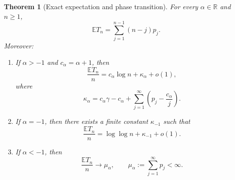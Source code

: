 \documentclass[11pt,a4paper]{article}
\newtheorem{theorem}{Theorem}[section]
\newcommand{\E}{\mathbb{E}}
\newcommand{\1}{\mathbf{1}}
\newcommand{\R}{\mathbb{R}}
\begin{document}
\begin{theorem}[Exact expectation and phase transition]
\label{thm:expectation}
For every $\alpha\in\R$ and $n\ge1$,
\begin{equation}\label{eq:ETexact}
\E T_n=\sum_{j=1}^{n-1}(n-j)p_j.
\end{equation}
Moreover:
\begin{enumerate}[label=(\roman*)]
\item If $\alpha>-1$ and $c_\alpha=\alpha+1$, then
\begin{equation}\label{eq:ET-log}
\frac{\E T_n}{n}
=
c_\alpha\log n+\kappa_\alpha+o(1),
\end{equation}
where
\begin{equation}\label{eq:kappa-alpha}
\kappa_\alpha
=
c_\alpha\gamma-c_\alpha
+
\sum_{j=1}^\infty
\left(p_j-\frac{c_\alpha}{j}\right).
\end{equation}

\item If $\alpha=-1$, then there exists a finite constant
$\kappa_{-1}$ such that
\begin{equation}\label{eq:ET-loglog}
\frac{\E T_n}{n}
=
\log\log n+\kappa_{-1}+o(1).
\end{equation}

\item If $\alpha<-1$, then
\begin{equation}\label{eq:ET-constant}
\frac{\E T_n}{n}\longrightarrow
\mu_\alpha,
\qquad
\mu_\alpha:=\sum_{j=1}^\infty p_j<\infty.
\end{equation}
\end{enumerate}
\end{theorem}
\end{document}
